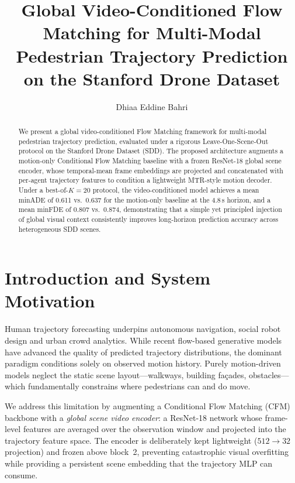 \documentclass[11pt,a4paper]{article}
\title{Global Video-Conditioned Flow Matching for Multi-Modal Pedestrian Trajectory Prediction on the Stanford Drone Dataset}
\author{Dhiaa Eddine Bahri}
\begin{document}
\maketitle

\begin{abstract}
We present a global video-conditioned Flow Matching framework for multi-modal pedestrian trajectory prediction, evaluated under a rigorous Leave-One-Scene-Out protocol on the Stanford Drone Dataset (SDD).  The proposed architecture augments a motion-only Conditional Flow Matching baseline\citep{fu2025moflow} with a frozen ResNet-18 \citep{he2016deep} global scene encoder, whose temporal-mean frame embeddings are projected and concatenated with per-agent trajectory features to condition a lightweight MTR-style \citep{shi2022motion} motion decoder.  Under a best-of-$K=20$ protocol, the video-conditioned model achieves a mean minADE of 0.611 vs.\ 0.637 for the motion-only baseline at the 4.8\,s horizon, and a mean minFDE of 0.807 vs.\ 0.874, demonstrating that a simple yet principled injection of global visual context consistently improves long-horizon prediction accuracy across heterogeneous SDD scenes.
\end{abstract}

\section{Introduction and System Motivation}
\label{sec:intro}
Human trajectory forecasting underpins autonomous navigation, social robot design and urban crowd analytics.  While recent flow-based generative models \citep{lipman2023flow} have advanced the quality of predicted trajectory distributions, the dominant paradigm conditions solely on observed motion history.  Purely motion-driven models neglect the static scene layout---walkways, building fa\c{c}ades, obstacles---which fundamentally constrains where pedestrians can and do move.

We address this limitation by augmenting a Conditional Flow Matching (CFM) backbone \citep{fu2025moflow} with a \emph{global scene video encoder}: a ResNet-18 network whose frame-level features are averaged over the observation window and projected into the trajectory feature space.  The encoder is deliberately kept lightweight ($512 \to 32$ projection) and frozen above block~2, preventing catastrophic visual overfitting while providing a persistent scene embedding that the trajectory MLP can consume.
\end{document}
